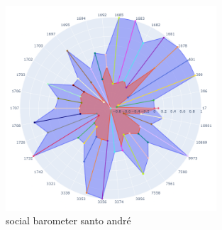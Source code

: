 \begin{figure}[htb]
	\centering
	\includegraphics[width=0.7\textwidth]{images/social_barometer_santo_andre.png}
	\caption{social barometer santo andré}
	\label{fig:social_barometer_santo_andre}
\end{figure}

